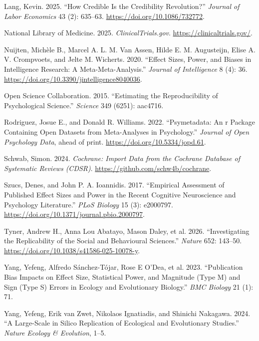 \documentclass[
  11pt,
]{article}
\newlength{\cslhangindent}
\newenvironment{CSLReferences}[2] %
 {\begin{list}{}{%
  \setlength{\itemindent}{0pt}
  \setlength{\leftmargin}{0pt}
  \setlength{\parsep}{0pt}
  \ifodd #1
   \setlength{\leftmargin}{\cslhangindent}
   \setlength{\itemindent}{-1\cslhangindent}
  \fi
  \setlength{\itemsep}{#2\baselineskip}}}
 {\end{list}}
\begin{document}
\begin{CSLReferences}{1}{1}
Lang, Kevin. 2025. {``How Credible Is the Credibility Revolution?''}
\emph{Journal of Labor Economics} 43 (2): 635--63.
\url{https://doi.org/10.1086/732772}.

National Library of Medicine. 2025. \emph{ClinicalTrials.gov}.
\url{https://clinicaltrials.gov/}.

Nuijten, Michèle B., Marcel A. L. M. Van Assen, Hilde E. M. Augusteijn,
Elise A. V. Crompvoets, and Jelte M. Wicherts. 2020. {``Effect {Sizes},
{Power}, and {Biases} in {Intelligence Research}: {A
Meta-Meta-Analysis}.''} \emph{Journal of Intelligence} 8 (4): 36.
\url{https://doi.org/10.3390/jintelligence8040036}.

Open Science Collaboration. 2015. {``Estimating the Reproducibility of
Psychological Science.''} \emph{Science} 349 (6251): aac4716.

Rodriguez, Josue E., and Donald R. Williams. 2022. {``Psymetadata: An r
Package Containing Open Datasets from Meta-Analyses in Psychology.''}
\emph{Journal of Open Psychology Data}, ahead of print.
\url{https://doi.org/10.5334/jopd.61}.

Schwab, Simon. 2024. \emph{Cochrane: Import Data from the Cochrane
Database of Systematic Reviews (CDSR)}.
\url{https://github.com/schw4b/cochrane}.

Szucs, Denes, and John P. A. Ioannidis. 2017. {``Empirical Assessment of
Published Effect Sizes and Power in the Recent Cognitive Neuroscience
and Psychology Literature.''} \emph{PLoS Biology} 15 (3): e2000797.
\url{https://doi.org/10.1371/journal.pbio.2000797}.

{Tyner, Andrew H., Anna Lou Abatayo, Mason Daley, et al.} 2026.
{``Investigating the Replicability of the Social and Behavioural
Sciences.''} \emph{Nature} 652: 143--50.
\url{https://doi.org/10.1038/s41586-025-10078-y}.

Yang, Yefeng, Alfredo Sánchez-Tójar, Rose E O'Dea, et al. 2023.
{``Publication Bias Impacts on Effect Size, Statistical Power, and
Magnitude (Type {M}) and Sign (Type {S}) Errors in Ecology and
Evolutionary Biology.''} \emph{BMC Biology} 21 (1): 71.

Yang, Yefeng, Erik van Zwet, Nikolaos Ignatiadis, and Shinichi Nakagawa.
2024. {``A Large-Scale in Silico Replication of Ecological and
Evolutionary Studies.''} \emph{Nature Ecology \& Evolution}, 1--5.

\end{CSLReferences}
\end{document}
